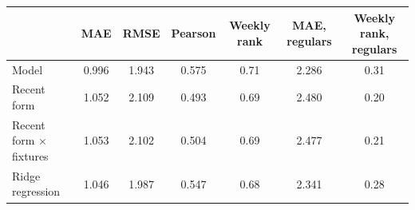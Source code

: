 \begin{tabular}{lcccccc}
\toprule
 & MAE & RMSE & Pearson & Weekly rank & MAE, regulars & Weekly rank, regulars \\
\midrule
Model & 0.996 & 1.943 & 0.575 & 0.71 & 2.286 & 0.31 \\
Recent form & 1.052 & 2.109 & 0.493 & 0.69 & 2.480 & 0.20 \\
Recent form $\times$ fixtures & 1.053 & 2.102 & 0.504 & 0.69 & 2.477 & 0.21 \\
Ridge regression & 1.046 & 1.987 & 0.547 & 0.68 & 2.341 & 0.28 \\
\bottomrule
\end{tabular}
